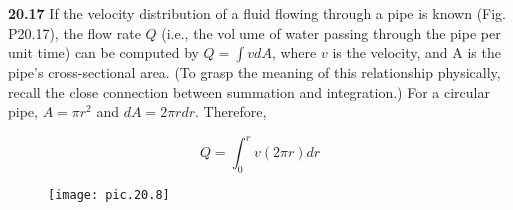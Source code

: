 \begin{multicols}{2}
\textbf{20.17} If the velocity distribution of a fluid flowing through
a pipe is known (Fig. P20.17), the flow rate $Q$ (i.e., the volume of water passing through the pipe per unit time) can be
computed by $Q = \int v dA$, where $v$ is the velocity, and A is
the pipe’s cross-sectional area. (To grasp the meaning of this
relationship physically, recall the close connection between
summation and integration.) For a circular pipe, $A = \pi r^{2}$ and $dA = 2 \pi r dr$. Therefore,

	$$Q = \int^{r}_{0} v(2 \pi r) dr$$
	



\end{multicols}

\begin{figure}[hbt!]
	\texttt{[image: pic.20.8]}
	\caption{} \hline
	\label{pic.20.8}
\end{figure}

